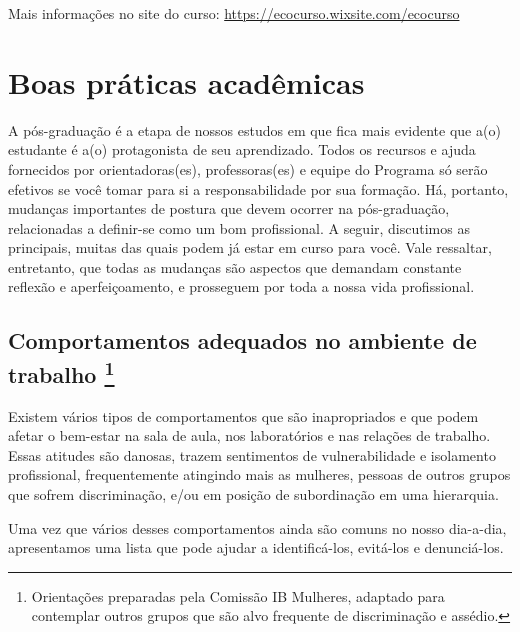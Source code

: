 Mais informações no site do curso: \url{https://ecocurso.wixsite.com/ecocurso}

\chapter[Boas práticas acadêmicas]{Boas práticas acadêmicas}
\label{sec:boasprat}

A pós-graduação é a etapa de nossos estudos em que fica mais evidente
que a(o) estudante é a(o) protagonista de seu aprendizado. Todos os
recursos e ajuda fornecidos por orientadoras(es), professoras(es) e
equipe do Programa só serão efetivos se você tomar para si a
responsabilidade por sua formação. Há, portanto, mudanças importantes
de postura que devem ocorrer na pós-graduação, relacionadas a
definir-se como um bom profissional. A seguir, discutimos as
principais, muitas das quais podem já estar em curso para você. Vale
ressaltar, entretanto, que todas as mudanças são aspectos que demandam
constante reflexão e aperfeiçoamento, e prosseguem por toda a nossa
vida profissional.

\section[Comportamentos adequados no ambiente de trabalho]{Comportamentos adequados no ambiente de trabalho \footnote{Orientações preparadas pela Comissão IB Mulheres, adaptado para contemplar outros grupos que são alvo frequente de discriminação e assédio.}} 

Existem vários tipos de comportamentos que são inapropriados e que
podem afetar o bem-estar na sala de aula, nos laboratórios e nas
relações de trabalho. Essas atitudes são danosas, trazem sentimentos
de vulnerabilidade e isolamento profissional, frequentemente atingindo
mais as mulheres, pessoas de outros grupos que sofrem discriminação,
e/ou em posição de subordinação em uma hierarquia.

Uma vez que vários desses comportamentos ainda são comuns no nosso
dia-a-dia, apresentamos uma lista que pode ajudar a identificá-los,
evitá-los e denunciá-los.

